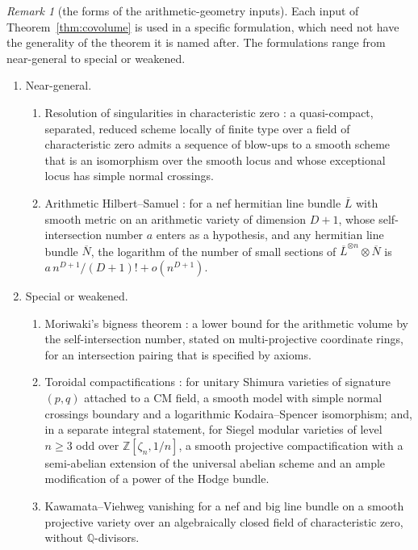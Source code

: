 \documentclass[11pt]{amsbook}
\theoremstyle{plain}
\theoremstyle{definition}
\theoremstyle{remark}
\newtheorem{remark}[theorem]{Remark}
\numberwithin{equation}{section}
\numberwithin{figure}{chapter}
\numberwithin{table}{chapter}
\newcommand{\Q}{\mathbb{Q}}
\newcommand{\Z}{\mathbb{Z}}
\begin{document}
\begin{remark}[the forms of the arithmetic-geometry inputs]
\label{rem:ag-strength}
Each input of Theorem~\ref{thm:covolume} is used in a specific
formulation, which need not have the generality of the theorem it is
named after. The formulations range from near-general to special or
weakened.
\begin{enumerate}[label=(\arabic*)]
\item Near-general.
\begin{enumerate}[label=(\alph*)]
\item Resolution of singularities in characteristic zero
\cite{Hironaka1964}: a quasi-compact, separated, reduced scheme
locally of finite type over a field of characteristic zero admits a
sequence of blow-ups to a smooth scheme that is an isomorphism over
the smooth locus and whose exceptional locus has simple normal
crossings.
\item Arithmetic Hilbert--Samuel \cite{GilletSoule1992,AbbesBouche1995}:
for a nef hermitian line bundle $\overline L$ with smooth metric on an
arithmetic variety of dimension $D+1$, whose self-intersection number
$a$ enters as a hypothesis, and any hermitian line bundle $\overline
N$, the logarithm of the number of small sections of $\overline
L^{\otimes n}\otimes\overline N$ is $a\,n^{D+1}/(D+1)!+o(n^{D+1})$.
\end{enumerate}
\item Special or weakened.
\begin{enumerate}[label=(\alph*)]
\item Moriwaki's bigness theorem \cite{Moriwaki2009}: a lower bound for
the arithmetic volume by the self-intersection number, stated on
multi-projective coordinate rings, for an intersection pairing that is
specified by axioms.
\item Toroidal compactifications \cite{FaltingsChai1990,Lan2013}: for
unitary Shimura varieties of signature $(p,q)$ attached to a CM field,
a smooth model with simple normal crossings boundary and a logarithmic
Kodaira--Spencer isomorphism; and, in a separate integral statement,
for Siegel modular varieties of level $n\ge3$ odd over
$\Z[\zeta_n,1/n]$, a smooth projective compactification with a
semi-abelian extension of the universal abelian scheme and an ample
modification of a power of the Hodge bundle.
\item Kawamata--Viehweg vanishing \cite{Kawamata1982,Viehweg1982}
for a nef and big line bundle on a
smooth projective variety over an algebraically closed field of
characteristic zero, without $\Q$-divisors.

\end{enumerate}
\end{enumerate}
\end{remark}
\end{document}
